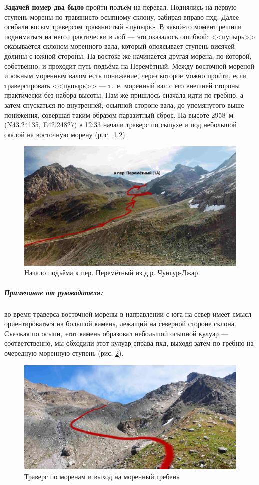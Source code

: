 \textbf{Задачей номер два было} пройти подъём на перевал. Поднялись на первую ступень морены по травянисто-осыпному склону, забирая вправо пхд. Далее огибали косым траверсом травянистый «пупырь». В какой-то момент решили подниматься на него практически в лоб --- это оказалось ошибкой: <<пупырь>> оказывается склоном моренного вала, который опоясывает ступень висячей долины с южной стороны. На востоке же начинается другая морена, по которой, собственно, и проходит путь подъёма на Перемётный. Между восточной мореной и южным моренным валом есть понижение, через которое можно пройти, если траверсировать <<пупырь>> --- т.~е. моренный вал с его внешней стороны практически без набора высоты. Нам же пришлось сначала идти по гребню, а затем спускаться по внутренней, осыпной стороне вала, до упомянутого выше понижения, совершая таким образом паразитный сброс. На высоте 2958~м (N43.24135\degree, E42.24827\degree) в 12:33  начали траверс по сыпухе и под небольшой скалой на восточную морену (рис.~\ref{fig:perem_1},\ref{fig:DSC_0280}).

\begin{figure}[h!]
	\centering
	\includegraphics[width=0.7\linewidth]{../pics/perem_1}
	\caption{Начало подъёма к пер. Перемётный из д.р. Чунгур-Джар}
	\label{fig:perem_1}
\end{figure}  

\subparagraph{Примечание от руководителя:} во время траверса восточной морены в направлении с юга на север имеет смысл ориентироваться на большой камень, лежащий на северной стороне склона. Съезжая по осыпи, этот камень образовал небольшой осыпной кулуар --- соответственно, мы обходили этот кулуар справа пхд, выходя затем по гребню на очередную моренную ступень (рис. \ref{fig:DSC_0280}).

\begin{figure}[h!]
	\centering
	\includegraphics[width=0.7\linewidth]{../pics/DSC_0280.jpg}
	\caption{Траверс по моренам и выход на моренный гребень}
	\label{fig:DSC_0280}
\end{figure}


